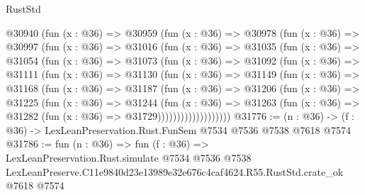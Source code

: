 \begin{lexlean}{RustStd}
\begin{coremodule}
  @30940
    (fun (x : @36) =>
    @30959
      (fun (x : @36) =>
      @30978
        (fun (x : @36) =>
        @30997
          (fun (x : @36) =>
          @31016
            (fun (x : @36) =>
            @31035
              (fun (x : @36) =>
              @31054
                (fun (x : @36) =>
                @31073
                  (fun (x : @36) =>
                  @31092
                    (fun (x : @36) =>
                    @31111
                      (fun (x : @36) =>
                      @31130
                        (fun (x : @36) =>
                        @31149
                          (fun (x : @36) =>
                          @31168
                            (fun (x : @36) =>
                            @31187
                              (fun (x : @36) =>
                              @31206
                                (fun (x : @36) =>
                                @31225
                                  (fun (x : @36) =>
                                  @31244
                                    (fun (x : @36) =>
                                    @31263
                                      (fun (x : @36) =>
                                      @31282 (fun (x : @36) => @31729)))))))))))))))))))
@31776 := (n : @36) -> (f : @36) -> LexLeanPreservation.Rust.FunSem @7534 @7536 @7538 @7618 @7574
@31786 := fun (n : @36) =>
  fun (f : @36) =>
  LexLeanPreservation.Rust.simulate
    @7534
    @7536
    @7538
    LexLeanPreserve.C11e9840d23e13989e32e676c4caf4624.R55.RustStd.crate_ok
    @7618
    @7574
\end{coremodule}
\end{lexlean}
